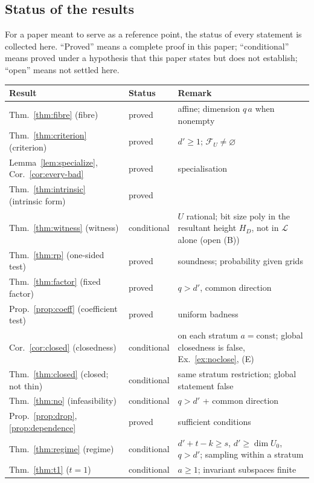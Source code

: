 \documentclass[journal]{IEEEtran}
\theoremstyle{plainn}
\theoremstyle{remark}
\begin{document}
\subsection{Status of the results}\label{sec:status}

For a paper meant to serve as a reference point, the status of every statement is collected here.
``Proved'' means a complete proof in this paper; ``conditional'' means proved under a hypothesis
that this paper states but does not establish; ``open'' means not settled here.

\begin{center}
\footnotesize
\begin{tabular}{@{}p{}p{}p{}@{}}
\toprule
Result & Status & Remark \\
\midrule
Thm.~\ref{thm:fibre} (fibre) & proved & affine; dimension $q\,a$ when nonempty \\
Thm.~\ref{thm:criterion} (criterion) & proved & $d'\ge1$; $\mathcal F_U\ne\varnothing$ \\
Lemma~\ref{lem:specialize}, Cor.~\ref{cor:every-bad} & proved & specialisation \\
Thm.~\ref{thm:intrinsic} (intrinsic form) & proved & \\
Thm.~\ref{thm:witness} (witness) & conditional & $U$ rational; bit size poly in the resultant height $H_D$, not in $\mathcal L$ alone (open (B)) \\
Thm.~\ref{thm:rp} (one-sided test) & proved & soundness; probability given grids \\
Thm.~\ref{thm:factor} (fixed factor) & proved & $q>d'$, common direction \\
Prop.~\ref{prop:coeff} (coefficient test) & proved & uniform badness \\
Cor.~\ref{cor:closed} (closedness) & conditional & on each stratum $a=\mathrm{const}$; global closedness is false, Ex.~\ref{ex:noclose}, (E) \\
Thm.~\ref{thm:closed} (closed; not thin) & conditional & same stratum restriction; global statement false \\
Thm.~\ref{thm:no} (infeasibility) & conditional & $q>d'$ + common direction \\
Prop.~\ref{prop:drop}, \ref{prop:dependence} & proved & sufficient conditions \\
Thm.~\ref{thm:regime} (regime) & conditional & $d'+t-k\ge s$, $d'\ge\dim U_0$, $q>d'$; sampling within a stratum \\
Thm.~\ref{thm:t1} ($t=1$) & conditional & $a\ge1$; invariant subspaces finite \\
\bottomrule
\end{tabular}
\end{center}
\end{document}
